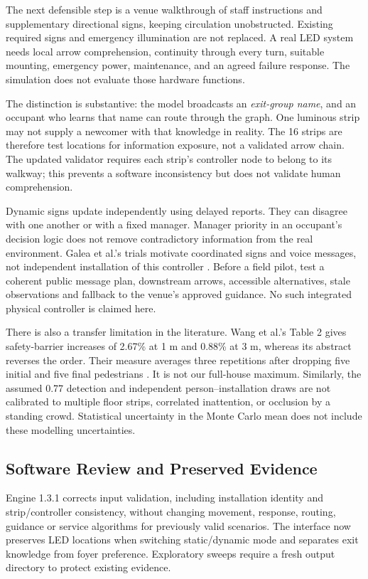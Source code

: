 The next defensible step is a venue walkthrough of staff instructions and supplementary directional signs, keeping circulation unobstructed. Existing required signs and emergency illumination are not replaced. A real LED system needs local arrow comprehension, continuity through every turn, suitable mounting, emergency power, maintenance, and an agreed failure response. The simulation does not evaluate those hardware functions.

The distinction is substantive: the model broadcasts an \emph{exit-group name}, and an occupant who learns that name can route through the graph. One luminous strip may not supply a newcomer with that knowledge in reality. The 16 strips are therefore test locations for information exposure, not a validated arrow chain. The updated validator requires each strip's controller node to belong to its walkway; this prevents a software inconsistency but does not validate human comprehension.

Dynamic signs update independently using delayed reports. They can disagree with one another or with a fixed manager. Manager priority in an occupant's decision logic does not remove contradictory information from the real environment. Galea et al.'s trials motivate coordinated signs and voice messages, not independent installation of this controller \cite{galea2017}. Before a field pilot, test a coherent public message plan, downstream arrows, accessible alternatives, stale observations and fallback to the venue's approved guidance. No such integrated physical controller is claimed here.

There is also a transfer limitation in the literature. Wang et al.'s Table 2 gives safety-barrier increases of 2.67\% at 1 m and 0.88\% at 3 m, whereas its abstract reverses the order. Their measure averages three repetitions after dropping five initial and five final pedestrians \cite{wang}. It is not our full-house maximum. Similarly, the assumed 0.77 detection and independent person--installation draws are not calibrated to multiple floor strips, correlated inattention, or occlusion by a standing crowd. Statistical uncertainty in the Monte Carlo mean does not include these modelling uncertainties.


\subsection{Software Review and Preserved Evidence}
Engine 1.3.1 corrects input validation, including installation identity and strip/controller consistency, without changing movement, response, routing, guidance or service algorithms for previously valid scenarios. The interface now preserves LED locations when switching static/dynamic mode and separates exit knowledge from foyer preference. Exploratory sweeps require a fresh output directory to protect existing evidence.

